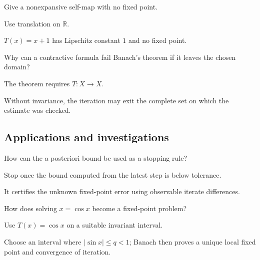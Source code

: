 \begin{exercise}\label{exr:ii16-expand-11}
Give a nonexpansive self-map with no fixed point.
\end{exercise}
\begin{hint}
Use translation on \(\mathbb R\).
\end{hint}
\begin{solution}
\(T(x)=x+1\) has Lipschitz constant \(1\) and no fixed point.
\end{solution}

\begin{exercise}\label{exr:ii16-expand-12}
Why can a contractive formula fail Banach's theorem if it leaves the chosen domain?
\end{exercise}
\begin{hint}
The theorem requires \(T:X\to X\).
\end{hint}
\begin{solution}
Without invariance, the iteration may exit the complete set on which the estimate was checked.
\end{solution}

\subsection*{Applications and investigations}

\begin{exercise}\label{exr:ii16-expand-13}
How can the a posteriori bound be used as a stopping rule?
\end{exercise}
\begin{hint}
Stop once the bound computed from the latest step is below tolerance.
\end{hint}
\begin{solution}
It certifies the unknown fixed-point error using observable iterate differences.
\end{solution}

\begin{exercise}\label{exr:ii16-expand-14}
How does solving \(x=\cos x\) become a fixed-point problem?
\end{exercise}
\begin{hint}
Use \(T(x)=\cos x\) on a suitable invariant interval.
\end{hint}
\begin{solution}
Choose an interval where \(|\sin x|\le q<1\); Banach then proves a unique local fixed point and convergence of iteration.
\end{solution}

